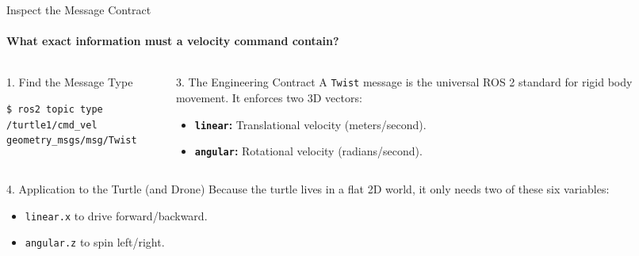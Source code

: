 \begin{frame}[fragile]{Inspect the Message Contract}
\framesubtitle{What exact information must a velocity command contain?}

\footnotesize

\begin{columns}[T,onlytextwidth]

    \begin{column}{0.48\textwidth}
        \begin{block}{1. Find the Message Type}
\begin{verbatim}
$ ros2 topic type /turtle1/cmd_vel
geometry_msgs/msg/Twist
\end{verbatim}
        \end{block}
    \end{column}

    \begin{column}{0.48\textwidth}
        \pause
        \begin{block}{3. The Engineering Contract}
            A \texttt{Twist} message is the universal ROS 2 standard for rigid body movement. It enforces two 3D vectors:
            \begin{itemize}
                \setlength{\itemsep}{0.3em}
                \item \textbf{\texttt{linear}:} Translational velocity (meters/second).
                \item \textbf{\texttt{angular}:} Rotational velocity (radians/second).
            \end{itemize}
        \end{block}

        \vspace{0.15cm}
    \end{column}

\end{columns}

        \begin{alertblock}{4. Application to the Turtle (and Drone)}
            Because the turtle lives in a flat 2D world, it only needs two of these six variables:
            \begin{itemize}
                \setlength{\itemsep}{0.2em}
                \item \texttt{linear.x} to drive forward/backward.
                \item \texttt{angular.z} to spin left/right.
            \end{itemize}
            \vspace{0.1cm}
        \end{alertblock}
\end{frame}
